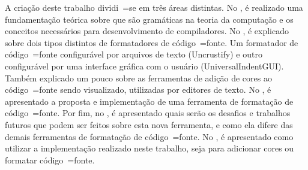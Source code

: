 A criação deste trabalho dividi~=se em três áreas distintas.
No ,
é realizado uma fundamentação teórica sobre que são gramáticas na teoria da computação e
os conceitos necessários para desenvolvimento de compiladores.
No ,
é explicado sobre dois tipos distintos de formatadores de código~=fonte.
Um formatador de código~=fonte configurável por arquivos de texto (Uncrustify) e
outro configurável por uma interface gráfica com o usuário (UniversalIndentGUI).
Também explicado um pouco sobre as ferramentas de adição de cores ao código~=fonte sendo visualizado,
utilizadas por editores de texto.
No ,
é apresentado a proposta e
implementação de uma ferramenta de formatação de código~=fonte.
Por fim,
no ,
é apresentado quais serão os desafios e
trabalhos futuros que podem ser feitos sobre esta nova ferramenta,
e como ela difere das demais ferramentas de formatação de código~=fonte.
No ,
é apresentado como utilizar a implementação realizado neste trabalho,
seja para adicionar cores ou
formatar código~=fonte.
